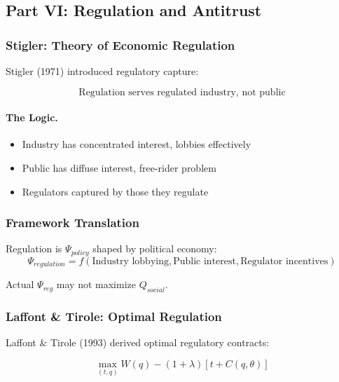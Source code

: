 \subsection{Part VI: Regulation and Antitrust}

\subsubsection{Stigler: Theory of Economic Regulation}

Stigler (1971) introduced regulatory capture:

\begin{equation}
\boxed{
\text{Regulation serves regulated industry, not public}
}
\label{eq:capture}
\end{equation}

\paragraph{The Logic.}
\begin{itemize}
    \item Industry has concentrated interest, lobbies effectively
    \item Public has diffuse interest, free-rider problem
    \item Regulators captured by those they regulate
\end{itemize}

\subsubsection{Framework Translation}

Regulation is $\Psi_{policy}$ shaped by political economy:
\begin{equation}
\Psi_{regulation} = f(\text{Industry lobbying}, \text{Public interest}, \text{Regulator incentives})
\end{equation}

Actual $\Psi_{reg}$ may not maximize $Q_{social}$.

\subsubsection{Laffont \& Tirole: Optimal Regulation}

Laffont \& Tirole (1993) derived optimal regulatory contracts:

\begin{equation}
\boxed{
\max_{(t, q)} W(q) - (1 + \lambda)[t + C(q, \theta)]
}
\label{eq:laffont-tirole}
\end{equation}

